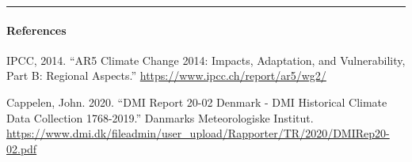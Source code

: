 \documentclass[
]{article}
\let\oldparagraph\paragraph
\renewcommand{\paragraph}[1]{\oldparagraph{#1}\mbox{}}
\begin{document}
\begin{center}\rule{0.5\linewidth}{\linethickness}\end{center}

\hypertarget{references}{%
\paragraph{References}\label{references}}

IPCC, 2014. ``AR5 Climate Change 2014: Impacts, Adaptation, and
Vulnerability, Part B: Regional Aspects.''
\url{https://www.ipcc.ch/report/ar5/wg2/}

Cappelen, John. 2020. ``DMI Report 20-02 Denmark - DMI Historical
Climate Data Collection 1768-2019.'' Danmarks Meteorologiske Institut.
\url{https://www.dmi.dk/fileadmin/user_upload/Rapporter/TR/2020/DMIRep20-02.pdf}
\end{document}
